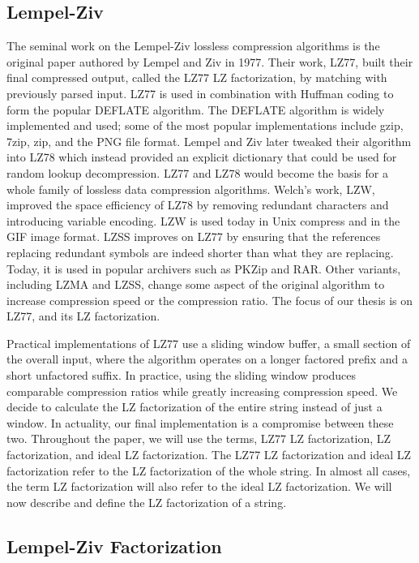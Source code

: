 \subsection{Lempel-Ziv}

The seminal work on the Lempel-Ziv lossless compression algorithms is the original paper authored by Lempel and Ziv in 1977\cite{Ziv77auniversal}. 
Their work, LZ77, built their final compressed output, called the LZ77 LZ factorization, by matching with previously parsed input.
LZ77 is used in combination with Huffman coding to form the popular DEFLATE algorithm\cite{deutsch1996deflate}.
The DEFLATE algorithm is widely implemented and used; some of the most popular implementations include gzip, 7zip, zip, and the PNG file format.
Lempel and Ziv later tweaked their algorithm into LZ78 which instead provided an explicit dictionary that could be used for random lookup decompression\cite{ziv1978compression}.
LZ77 and LZ78 would become the basis for a whole family of lossless data compression algorithms.
Welch's work, LZW, improved the space efficiency of LZ78 by removing redundant characters and introducing variable encoding\cite{welch1984technique}.
LZW is used today in Unix compress and in the GIF image format.
LZSS improves on LZ77 by ensuring that the references replacing redundant symbols are indeed shorter than what they are replacing\cite{lzss}.
Today, it is used in popular archivers such as PKZip and RAR.
Other variants, including LZMA and LZSS, change some aspect of the original algorithm to increase compression speed or the compression ratio.
The focus of our thesis is on LZ77, and its LZ factorization.

Practical implementations of LZ77 use a sliding window buffer, a small section of the overall input, where the algorithm operates on a longer factored prefix and a short unfactored suffix.
In practice, using the sliding window produces comparable compression ratios while greatly increasing compression speed.
We decide to calculate the LZ factorization of the entire string instead of just a window.
In actuality, our final implementation is a compromise between these two.
Throughout the paper, we will use the terms, LZ77 LZ factorization, LZ factorization, and ideal LZ factorization.
The LZ77 LZ factorization and ideal LZ factorization refer to the LZ factorization of the whole string.
In almost all cases, the term LZ factorization will also refer to the ideal LZ factorization.
We will now describe and define the LZ factorization of a string.

\subsection{Lempel-Ziv Factorization}

